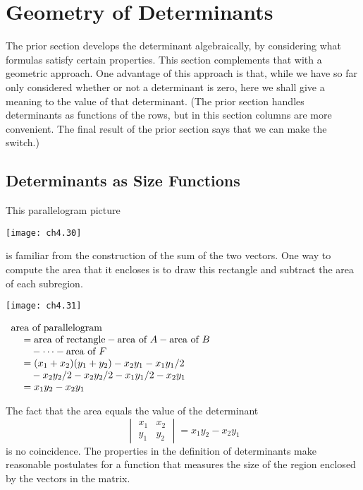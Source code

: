 \section{Geometry of Determinants}
The prior section develops the determinant algebraically, by
considering what formulas satisfy certain properties.
This section complements that with a geometric approach.
One advantage of this approach is that, while 
we have so far only considered whether or not a determinant is zero,
here we shall give a meaning to the value of that determinant.
(The prior section handles determinants as functions of the
rows, but in this section columns are more convenient.
The final result of the prior section says that we can make the switch.)










\subsection{Determinants as Size Functions}
This parallelogram picture
\begin{center}
  \texttt{[image: ch4.30]}
\end{center}
is familiar from the construction of the sum of the two vectors.
One way to compute the area that it encloses is to draw this rectangle
and subtract the area of each subregion.
\begin{center}
  \parbox{1.5in}{\hbox{}\hfil\texttt{[image: ch4.31]}\hfil\hbox{}}
  \quad
  \parbox{3.0in}{
    \hbox{}\hfil
    $\begin{array}{l}
       \text{area of parallelogram}                    \\
         \hbox{}\quad \hbox{}
            =\text{area of rectangle}
                -\text{area of $A$}-\text{area of $B$} \\
         \hbox{}\qquad \hbox{}
            -\cdots-\text{area of $F$}                   \\
         \hbox{}\quad \hbox{}
            =(x_1+x_2)(y_1+y_2)-x_2y_1-x_1y_1/2        \\
         \hbox{}\qquad \hbox{}
            -x_2y_2/2-x_2y_2/2-x_1y_1/2-x_2y_1         \\
         \hbox{}\quad \hbox{}
            =x_1y_2-x_2y_1        
    \end{array}$
    \hfil\hbox{}}
\end{center}
The fact that the area equals the value of the determinant
\begin{equation*}
  \begin{vmatrix}
    x_1  &x_2  \\
    y_1  &y_2
  \end{vmatrix}
  =x_1y_2-x_2y_1
\end{equation*}
is no coincidence.
The properties in the definition of determinants 
make reasonable postulates for a function 
that measures the size of the region
enclosed by the vectors in the matrix.

